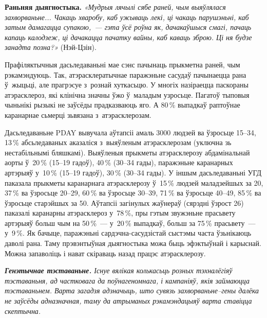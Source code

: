 
\textbf{Раньняя дыягностыка.} \emph{«Мудрыя лячылі сябе раней, чым выяўлялася захворваньне... Чакаць хваробу, каб ужываць лекі, ці чакаць парушэньні, каб затым дамагацца супакою,~--- гэта ўсё роўна як, дачакаўшыся смагі, пачаць капаць калодзеж, ці дачакацца пачатку вайны, каб каваць зброю. Ці ня будзе занадта позна?»} (Нэй-Цзін).

Прафіляктычныя дасьледаваньні мае сэнс пачынаць прыкметна раней, чым рэкамэндуюць. Так, атэрасклератычнае паражэньне сасудаў пачынаецца рана ў~жыцьці, але прагрэсуе з~рознай хуткасьцю. У многіх назіраецца паскораны атэрасклероз, які клінічна значны ўжо ў~маладым узросьце. Пагатоў тыповыя чыньнікі рызыкі не заўсёды прадказваюць яго. А 80\,\% выпадкаў раптоўнае каранарнае сьмерці зьвязана з~атэрасклерозам.

Дасьледаваньне PDAY вывучала аўтапсіі амаль 3000 людзей ва ўзросьце 15--34, 13\,\% абсьледаваных аказаліся з~выяўленым атэрасклерозам (уключна зь нестабільнымі бляшкамі). Выяўленыя прыкметы атэрасклерозу абдамінальнай аорты ў~20\,\% (15--19 гадоў), 40\,\% (30--34 гады), паражэньне каранарных артэрыяў у~10\,\% (15--19 гадоў), 30\,\% (30--34 гады). У іншым дасьледаваньні УГД паказала прыкметы каранарнага атэрасклерозу ў~15\,\% людзей маладзейшых за 20, 37\,\% ва ўзросьце 20--29, 60\,\% ва ўзросьце 30--39, 71\,\% ва ўзросьце 40--49, 85\,\% ва ўзросьце старэйшых за 50. Аўтапсіі загінулых жаўнераў (сярэдні ўзрост 26) паказалі каранарны атэрасклероз у~78\,\%, пры гэтым звужэньне прасьвету артэрыяў больш чым на 50\,\%~--- у~20\,\% выпадкаў, больш за 75\,\% прасьвету~--- у~9\,\%. Як бачыце, паражэньні сардэчна-сасудзістай сыстэмы часта ўзьнікаюць даволі рана. Таму прэвэнтыўная дыягностыка можа быць эфэктыўнай і карыснай. Можна запаволіць і нават скіраваць назад працэс атэрасклерозу.

\emph{\textbf{Генэтычнае тэставаньне.} Існуе вялікая колькасьць розных тэхналёгіяў тэставаньня, ад частковага да поўнагеномнага, і кампаніяў, якія займаюцца тэставаньнем. Варта загадзя адзначыць, што сувязь захворваньне--гены далёка не заўсёды адназначная, таму да атрыманых рэкамэндацыяў варта ставіцца скептычна.}

